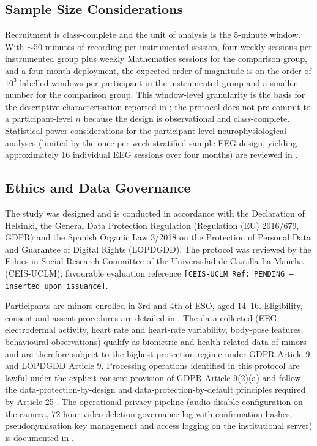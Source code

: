\subsection{Sample Size Considerations}\label{subsec:sample-size}

Recruitment is class-complete and the unit of analysis is the 5-minute window. With $\sim$50 minutes of recording per instrumented session, four weekly sessions per instrumented group plus weekly Mathematics sessions for the comparison group, and a four-month deployment, the expected order of magnitude is on the order of $10^3$ labelled windows per participant in the instrumented group and a smaller number for the comparison group. This window-level granularity is the basis for the descriptive characterisation reported in ; the protocol does not pre-commit to a participant-level $n$ because the design is observational and class-complete. Statistical-power considerations for the participant-level neurophysiological analyses (limited by the once-per-week stratified-sample EEG design, yielding approximately 16 individual EEG sessions over four months) are reviewed in .

\subsection{Ethics and Data Governance}\label{subsec:ethics}

The study was designed and is conducted in accordance with the Declaration of Helsinki, the General Data Protection Regulation (Regulation (EU) 2016/679, GDPR) and the Spanish Organic Law 3/2018 on the Protection of Personal Data and Guarantee of Digital Rights (LOPDGDD). The protocol was reviewed by the Ethics in Social Research Committee of the Universidad de Castilla-La Mancha (CEIS-UCLM); favourable evaluation reference \texttt{[CEIS-UCLM Ref: PENDING --- inserted upon issuance]}.

Participants are minors enrolled in 3rd and 4th of ESO, aged 14--16. Eligibility, consent and assent procedures are detailed in . The data collected (EEG, electrodermal activity, heart rate and heart-rate variability, body-pose features, behavioural observations) qualify as biometric and health-related data of minors and are therefore subject to the highest protection regime under GDPR Article 9 and LOPDGDD Article 9. Processing operations identified in this protocol are lawful under the explicit consent provision of GDPR Article 9(2)(a) and follow the data-protection-by-design and data-protection-by-default principles required by Article 25 \parencite{Macenaite2017_minors_gdpr,EDPB2020_consent}. The operational privacy pipeline (audio-disable configuration on the camera, 72-hour video-deletion governance log with confirmation hashes, pseudonymisation key management and access logging on the institutional server) is documented in .

